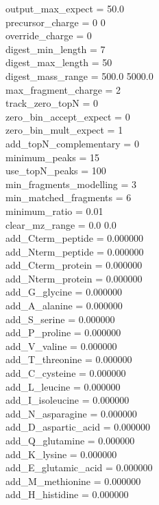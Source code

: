 \documentclass [11pt] {article}
\begin{document}
	output\_max\_expect = 50.0 \\
	precursor\_charge = 0 0 \\
	override\_charge = 0 \\	
	digest\_min\_length = 7 \\
	digest\_max\_length = 50 \\
	digest\_mass\_range = 500.0 5000.0	 \\		
	max\_fragment\_charge = 2 \\		
	track\_zero\_topN = 0 \\	
	zero\_bin\_accept\_expect = 0 \\		
	zero\_bin\_mult\_expect = 1 \\		
	add\_topN\_complementary = 0 \\
	minimum\_peaks = 15 \\	
	use\_topN\_peaks = 100 \\
	min\_fragments\_modelling = 3 \\
	min\_matched\_fragments = 6 \\
	minimum\_ratio = 0.01 \\	
	clear\_mz\_range = 0.0 0.0 \\		
	add\_Cterm\_peptide = 0.000000 \\
	add\_Nterm\_peptide = 0.000000 \\
	add\_Cterm\_protein = 0.000000 \\
	add\_Nterm\_protein = 0.000000 \\
	add\_G\_glycine = 0.000000 \\
	add\_A\_alanine = 0.000000 \\ 
	add\_S\_serine = 0.000000 \\
	add\_P\_proline = 0.000000 \\ 
	add\_V\_valine = 0.000000 \\
	add\_T\_threonine = 0.000000 \\ 
	add\_C\_cysteine = 0.000000 \\ 
	add\_L\_leucine = 0.000000 \\
	add\_I\_isoleucine = 0.000000 \\
	add\_N\_asparagine = 0.000000 \\
	add\_D\_aspartic\_acid = 0.000000 \\
	add\_Q\_glutamine = 0.000000 \\
	add\_K\_lysine = 0.000000 \\
	add\_E\_glutamic\_acid = 0.000000 \\
	add\_M\_methionine = 0.000000 \\
	add\_H\_histidine = 0.000000 \\
\end{document}
